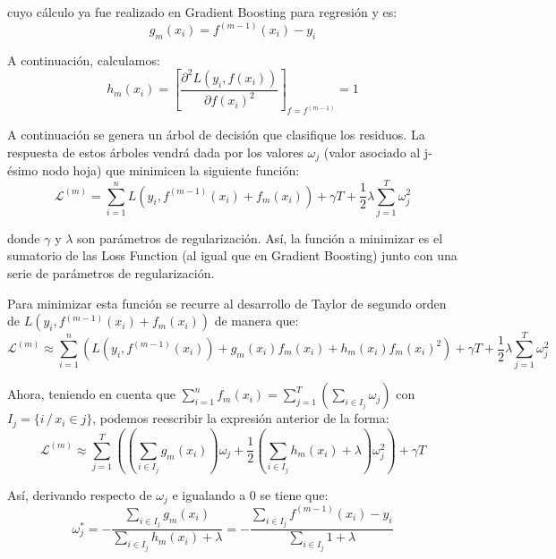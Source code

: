 \documentclass[12pt,twoside]{article}
\begin{document}
\noindent 
cuyo cálculo ya fue realizado en Gradient Boosting para regresión y es:
\begin{equation*}
g_{m}(x_i) = f^{(m-1)}(x_i) - y_i
\end{equation*}

A continuación, calculamos:
\begin{equation*}
h_{m}(x_i) = \left[ \frac{\partial^2 L(y_i, f(x_i))}{\partial f(x_i)^2} \right]_{f = f^{(m-1)}} = 1
\end{equation*}

A continuación se genera un árbol de decisión que clasifique los residuos. La respuesta de estos árboles vendrá dada por los valores $\omega_j$ (valor asociado al j-ésimo nodo hoja) que minimicen la siguiente función:
\begin{equation*}
\mathcal{L}^{(m)} = \sum_{i=1}^n L(y_i, f^{(m-1)}(x_i) + f_m(x_i)) + \gamma T + \frac{1}{2}\lambda \sum_{j=1}^T \omega_j^2
\end{equation*}

\noindent
donde $\gamma$ y $\lambda$ son parámetros de regularización. Así, la función a minimizar es el sumatorio de las Loss Function (al igual que en Gradient Boosting) junto con una serie de parámetros de regularización.

Para minimizar esta función se recurre al desarrollo de Taylor de segundo orden de $L(y_i, f{^{(m-1)}}(x_i) + f_m(x_i))$ de manera que:
\begin{equation*}
\mathcal{L}^{(m)} \approx \sum_{i=1}^n \left( L(y_i, f^{(m-1)}(x_i)) + g_m(x_i)f_m(x_i) + h_m(x_i)f_m(x_i)^2 \right)  + \gamma T + \frac{1}{2}\lambda \sum_{j=1}^T \omega_j^2
\end{equation*}

Ahora, teniendo en cuenta que $ \displaystyle \sum_{i=1}^n f_m(x_i) = \sum_{j = 1}^T \left( \sum_{i \in I_j} \omega_j \right)$ con $I_j = \{ i \, / \, x_i \in j \}$, podemos reescribir la expresión anterior de la forma:
\begin{equation*}
\mathcal{L}^{(m)} \approx \sum_{j = 1}^T \left( (\sum_{i \in I_j} g_m(x_i))\omega_j + \frac{1}{2}(\sum_{i\in I_j} h_m(x_i) + \lambda)\omega_j^2 \right) + \gamma T
\end{equation*}

Así, derivando respecto de $\omega_j$ e igualando a 0 se tiene que:
\begin{equation*}
\omega_j^* = - \frac{\sum_{i \in I_j} g_m(x_i)}{\sum_{i \in I_j} h_m(x_i) + \lambda} = - \frac{\sum_{i \in I_j} f^{(m-1)}(x_i) - y_i}{\sum_{i \in I_j} 1 + \lambda}
\end{equation*}
\end{document}
